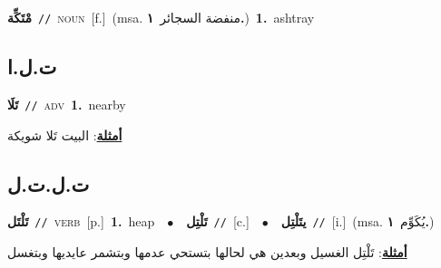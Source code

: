 \documentclass[10pt,a4paper,twoside]{article} %
\begin{document}
\begin{multicols}{2}
{\setlength\topsep{0pt}\textbf{\foreignlanguage{arabic}{مْتَكِّة}}\ {\color{gray}\texttt{//}\color{black}}\ \textsc{noun}\ [f.]\ \color{gray}(msa. \foreignlanguage{arabic}{منفضة السجائر}~\foreignlanguage{arabic}{\textbf{١.}})\color{black}\ \textbf{1.}~ashtray\ } \vspace{2mm}

\vspace{-3mm}
\subsection*{\color{blue}\foreignlanguage{arabic}{ت.ل.ا}\color{blue}{ (ntws)}} 

{\setlength\topsep{0pt}\textbf{\foreignlanguage{arabic}{تَلَا}}\ {\color{gray}\texttt{//}\color{black}}\ \textsc{adv}\ \textbf{1.}~nearby\  \begin{flushright}\color{gray}\foreignlanguage{arabic}{\textbf{\underline{\foreignlanguage{arabic}{أمثلة}}}: البيت تَلا شويكة}\end{flushright}\color{black}} \vspace{2mm}

\vspace{-3mm}
\subsection*{\color{blue}\foreignlanguage{arabic}{ت.ل.ت.ل}\color{blue}{}} 

{\setlength\topsep{0pt}\textbf{\foreignlanguage{arabic}{تَلْتَل}}\ {\color{gray}\texttt{//}\color{black}}\ \textsc{verb}\ [p.]\ \textbf{1.}~heap\ \ $\bullet$\ \ \setlength\topsep{0pt}\textbf{\foreignlanguage{arabic}{تَلْتِل}}\ {\color{gray}\texttt{//}\color{black}}\ [c.]\ \ $\bullet$\ \ \setlength\topsep{0pt}\textbf{\foreignlanguage{arabic}{يتَلْتِل}}\ {\color{gray}\texttt{//}\color{black}}\ [i.]\ \color{gray}(msa. \foreignlanguage{arabic}{يُكَوِّم}~\foreignlanguage{arabic}{\textbf{١.}})\color{black}\  \begin{flushright}\color{gray}\foreignlanguage{arabic}{\textbf{\underline{\foreignlanguage{arabic}{أمثلة}}}: تَلْتِل الغسيل وبعدين هي لحالها بتستحي عدمها وبتشمر عايديها وبتغسل}\end{flushright}\color{black}} \vspace{2mm}


\end{multicols}
\end{document}
